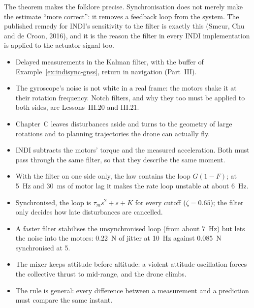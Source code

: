 The theorem makes the folklore precise. Synchronisation does not merely make the estimate \enquote{more correct}: it removes a feedback loop from the system. The published remedy for INDI's sensitivity to the filter is exactly this (Smeur, Chu and de Croon, 2016), and it is the reason the filter in every INDI implementation is applied to the actuator signal too.

\begin{lookahead}
\begin{itemize}[leftmargin=1.2em]
  \item Delayed measurements in the Kalman filter, with the buffer of Example~\ref{ex:indisync-gnss}, return in navigation (Part~III).
  \item The gyroscope's noise is not white in a real frame: the motors shake it at their rotation frequency. Notch filters, and why they too must be applied to both sides, are Lessons~III.20 and III.21.
  \item Chapter~C leaves disturbances aside and turns to the geometry of large rotations and to planning trajectories the drone can actually fly.
\end{itemize}
\end{lookahead}

\begin{remember}
\begin{itemize}
  \item INDI subtracts the motors' torque and the measured acceleration. Both must pass through the same filter, so that they describe the same moment.
  \item With the filter on one side only, the law contains the loop $G(1 - F)$; at \SI{5}{Hz} and \SI{30}{ms} of motor lag it makes the rate loop unstable at about \SI{6}{Hz}.
  \item Synchronised, the loop is $\tau_m s^2 + s + K$ for every cutoff ($\zeta = 0.65$); the filter only decides how late disturbances are cancelled.
  \item A faster filter stabilises the unsynchronised loop (from about \SI{7}{Hz}) but lets the noise into the motors: \SI{0.22}{N} of jitter at \SI{10}{Hz} against \SI{0.085}{N} synchronised at 5.
  \item The mixer keeps attitude before altitude: a violent attitude oscillation forces the collective thrust to mid-range, and the drone climbs.
  \item The rule is general: every difference between a measurement and a prediction must compare the same instant.
\end{itemize}
\end{remember}

